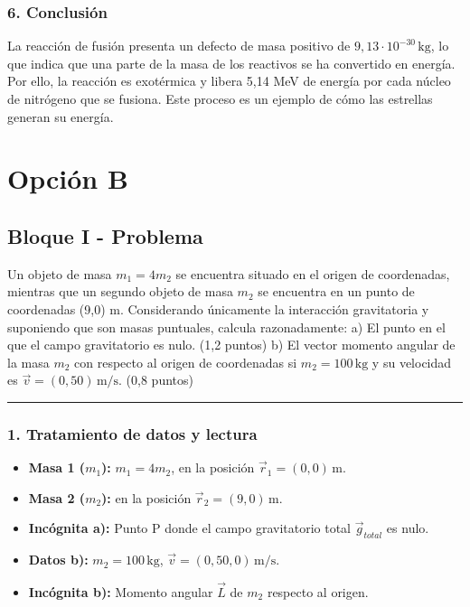 \subsubsection*{6. Conclusión}
\begin{cajaconclusion}
La reacción de fusión presenta un defecto de masa positivo de $9,13\cdot10^{-30}\,\text{kg}$, lo que indica que una parte de la masa de los reactivos se ha convertido en energía. Por ello, la reacción es exotérmica y libera 5,14 MeV de energía por cada núcleo de nitrógeno que se fusiona. Este proceso es un ejemplo de cómo las estrellas generan su energía.
\end{cajaconclusion}

\newpage

\section{Opción B}
\label{sec:B_2014_jul_ext}

\subsection{Bloque I - Problema}
\label{subsec:B1_2014_jul_ext}

\begin{cajaenunciado}
Un objeto de masa $m_{1}=4m_{2}$ se encuentra situado en el origen de coordenadas, mientras que un segundo objeto de masa $m_{2}$ se encuentra en un punto de coordenadas (9,0) m. Considerando únicamente la interacción gravitatoria y suponiendo que son masas puntuales, calcula razonadamente:
a) El punto en el que el campo gravitatorio es nulo. (1,2 puntos) 
b) El vector momento angular de la masa $m_{2}$ con respecto al origen de coordenadas si $m_{2}=100\,\text{kg}$ y su velocidad es $\vec{v}=(0,50)\,\text{m/s}$. (0,8 puntos) 
\end{cajaenunciado}
\hrule

\subsubsection*{1. Tratamiento de datos y lectura}
\begin{itemize}
    \item \textbf{Masa 1 ($m_1$):} $m_1 = 4m_2$, en la posición $\vec{r}_1=(0,0)\,\text{m}$.
    \item \textbf{Masa 2 ($m_2$):} en la posición $\vec{r}_2=(9,0)\,\text{m}$.
    \item \textbf{Incógnita a):} Punto P donde el campo gravitatorio total $\vec{g}_{total}$ es nulo.
    \item \textbf{Datos b):} $m_2 = 100\,\text{kg}$, $\vec{v}=(0,50,0)\,\text{m/s}$.
    \item \textbf{Incógnita b):} Momento angular $\vec{L}$ de $m_2$ respecto al origen.
\end{itemize}

